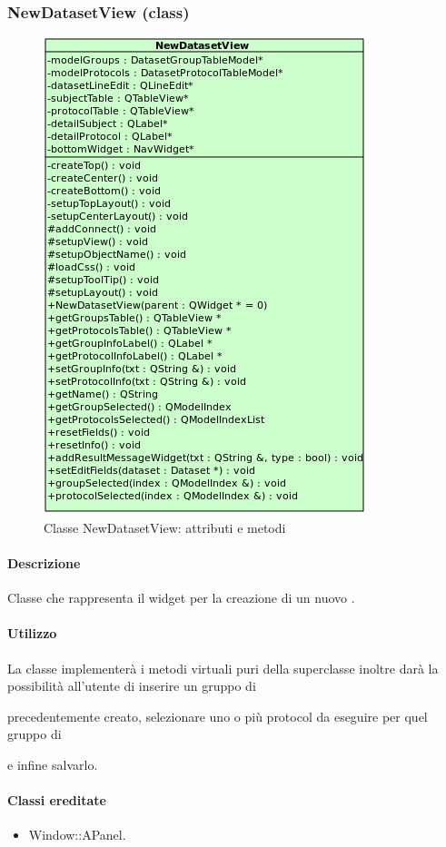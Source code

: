 \subsubsection{NewDatasetView (class)}
\label{speNdatV}
\begin{figure}[!h]
\centering
			\includegraphics[width=0.5\linewidth]{./Content/Immagini/view/NewDatasetView.png}
			\caption{Classe NewDatasetView: attributi e metodi}
			\label{cl_ndatview}
\end{figure}
\paragraph{Descrizione \\}
Classe che rappresenta il widget per la creazione di un nuovo \dataset{}.
\paragraph{Utilizzo\\}
La classe implementerà i metodi virtuali puri della superclasse inoltre darà la possibilità all'utente di inserire un gruppo di \subject{} precedentemente creato, selezionare uno o più protocol\g{} da eseguire per quel gruppo di \subject{} e infine salvarlo.
\paragraph{Classi ereditate\\}
\begin{itemize}
\item Window::APanel.
\end{itemize}
